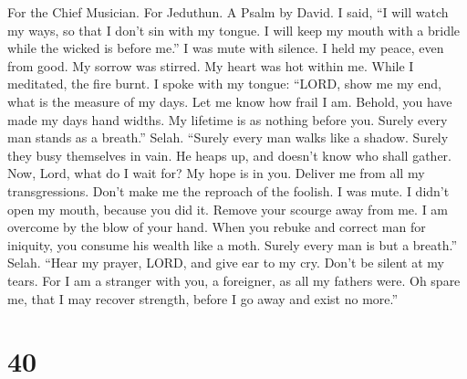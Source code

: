 For the Chief Musician. For Jeduthun. A Psalm by David.  I
said, ``I will watch my ways, so that I don't sin with my tongue. I will
keep my mouth with a bridle while the wicked is before me.''
 I was mute with silence. I held my peace, even from good.
My sorrow was stirred.  My heart was hot within me. While I
meditated, the fire burnt. I spoke with my tongue:  ``LORD,
show me my end, what is the measure of my days. Let me know how frail I
am.  Behold, you have made my days hand widths. My lifetime
is as nothing before you. Surely every man stands as a breath.'' Selah.
 ``Surely every man walks like a shadow. Surely they busy
themselves in vain. He heaps up, and doesn't know who shall gather.
 Now, Lord, what do I wait for? My hope is in you.
 Deliver me from all my transgressions. Don't make me the
reproach of the foolish.  I was mute. I didn't open my
mouth, because you did it.  Remove your scourge away from
me. I am overcome by the blow of your hand.  When you
rebuke and correct man for iniquity, you consume his wealth like a moth.
Surely every man is but a breath.'' Selah.  ``Hear my
prayer, LORD, and give ear to my cry. Don't be silent at my tears. For I
am a stranger with you, a foreigner, as all my fathers were.
 Oh spare me, that I may recover strength, before I go away
and exist no more.''

\hypertarget{section-39}{%
\section{40}\label{section-39}}

